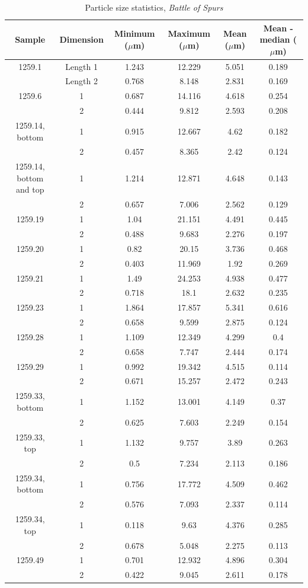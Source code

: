 \begin{table}[H]
\caption{Particle size statistics, \textit{Battle of Spurs}}
\centering
\label{table:stat_summary_bos}
\begin{tabular}{c c c c c c}
\toprule
Sample & Dimension & Minimum ($\mu$m) & Maximum ($\mu$m) & Mean ($\mu$m) & Mean - median ($\mu$m) \\
\midrule
1259.1 & Length 1 & 1.243 & 12.229 & 5.051 & 0.189 \\
~      & Length 2 & 0.768 & 8.148 & 2.831 & 0.169 \\
1259.6 & 1 & 0.687 & 14.116 & 4.618 & 0.254 \\
~      & 2 & 0.444 & 9.812 & 2.593 & 0.208 \\
1259.14, bottom & 1 & 0.915 & 12.667 & 4.62 & 0.182 \\
~      & 2 & 0.457 & 8.365 & 2.42 & 0.124 \\
1259.14, bottom and top & 1 & 1.214 & 12.871 & 4.648 & 0.143 \\
~      & 2 & 0.657 & 7.006 & 2.562 & 0.129 \\
1259.19 & 1 & 1.04 & 21.151 & 4.491 & 0.445 \\
~       & 2 & 0.488 & 9.683 & 2.276 & 0.197 \\
1259.20 & 1 & 0.82 & 20.15 & 3.736 & 0.468 \\
~       & 2 & 0.403 & 11.969 & 1.92 & 0.269 \\
1259.21 & 1 & 1.49 & 24.253 & 4.938 & 0.477 \\
~       & 2 & 0.718 & 18.1 & 2.632 & 0.235 \\
1259.23 & 1 & 1.864 & 17.857 & 5.341 & 0.616 \\
~       & 2 & 0.658 & 9.599 & 2.875 & 0.124 \\
1259.28 & 1 & 1.109 & 12.349 & 4.299 & 0.4 \\
~       & 2 & 0.658 & 7.747 & 2.444 & 0.174 \\
1259.29 & 1 & 0.992 & 19.342 & 4.515 & 0.114 \\
~       & 2 & 0.671 & 15.257 & 2.472 & 0.243 \\
1259.33, bottom & 1 & 1.152 & 13.001 & 4.149 & 0.37 \\
~       & 2 & 0.625 & 7.603 & 2.249 & 0.154 \\
1259.33, top & 1 & 1.132 & 9.757 & 3.89 & 0.263 \\
~       & 2 & 0.5 & 7.234 & 2.113 & 0.186 \\
1259.34, bottom & 1 & 0.756 & 17.772 & 4.509 & 0.462 \\
~       & 2 & 0.576 & 7.093 & 2.337 & 0.114 \\
1259.34, top & 1 & 0.118 & 9.63 & 4.376 & 0.285 \\
~       & 2 & 0.678 & 5.048 & 2.275 & 0.113 \\
1259.49 & 1 & 0.701 & 12.932 & 4.896 & 0.304 \\
~       & 2 & 0.422 & 9.045 & 2.611 & 0.178 \\
\bottomrule
\end{tabular}
\end{table}


